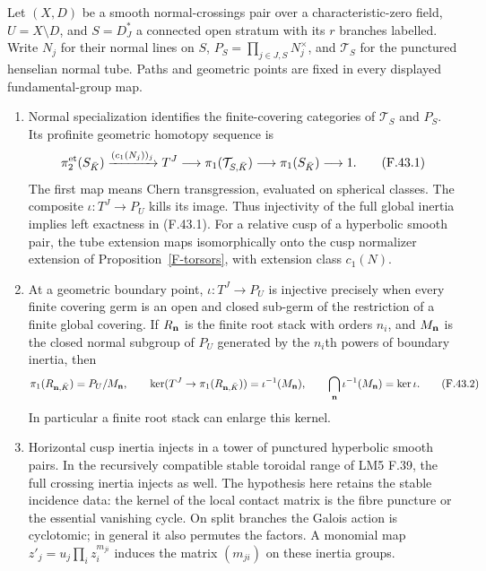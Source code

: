 \begin{proposition}
\label{F-normal-tube-comparison}
Let $(X,D)$ be a smooth normal-crossings pair over a characteristic-zero
field, $U=X\setminus D$, and $S=D_J^*$ a connected open stratum with
its $r$ branches labelled. Write $N_j$ for their normal lines on $S$,
$P_S=\prod_{j\in J,S}N_j^\times$, and $\mathcal T_S$ for the
punctured henselian normal tube. Paths and geometric points are fixed
in every displayed fundamental-group map.
\begin{enumerate}
\item Normal specialization identifies the finite-covering categories
of $\mathcal T_S$ and $P_S$. Its profinite geometric homotopy sequence is
\[
 \pi_2^{\rm et}(S_{\bar K})\xrightarrow{(c_1(N_j))_j}
 T^J\longrightarrow\pi_1(\mathcal T_{S,\bar K})
 \longrightarrow\pi_1(S_{\bar K})\longrightarrow1.
 \tag{F.43.1}
\]
The first map means Chern transgression, evaluated on spherical
classes. The composite $\iota:T^J\to P_U$ kills its image. Thus
injectivity of the full global inertia implies left exactness in
(F.43.1). For a relative cusp of a hyperbolic smooth pair, the tube
extension maps isomorphically onto the cusp normalizer extension
of Proposition~\ref{F-torsors}, with extension class $c_1(N)$.

\item At a geometric boundary point, $\iota:T^J\to P_U$ is injective
precisely when every finite covering germ is an open and closed
sub-germ of the restriction of a finite global covering. If $R_{\bf n}$
is the finite root stack with orders $n_i$, and $M_{\bf n}$ is the
closed normal subgroup of $P_U$ generated by the $n_i$th powers of
boundary inertia, then
\[
 \pi_1(R_{{\bf n},\bar K})=P_U/M_{\bf n},\qquad
 \ker(T^J\to\pi_1(R_{{\bf n},\bar K}))
       =\iota^{-1}(M_{\bf n}),\qquad
 \bigcap_{\bf n}\iota^{-1}(M_{\bf n})=\ker\iota.
 \tag{F.43.2}
\]
In particular a finite root stack can enlarge this kernel.

\item Horizontal cusp inertia injects in a tower of punctured
hyperbolic smooth pairs. In the recursively compatible stable
toroidal range of LM5 F.39, the full crossing inertia injects as
well. The hypothesis here retains the stable incidence data:
the kernel of the local contact matrix is the fibre puncture
or the essential vanishing cycle. On split branches the Galois
action is cyclotomic; in general it also permutes the factors.
A monomial map $z'_j=u_j\prod_i z_i^{m_{ji}}$ induces the matrix
$(m_{ji})$ on these inertia groups.


\end{enumerate}
\end{proposition}
